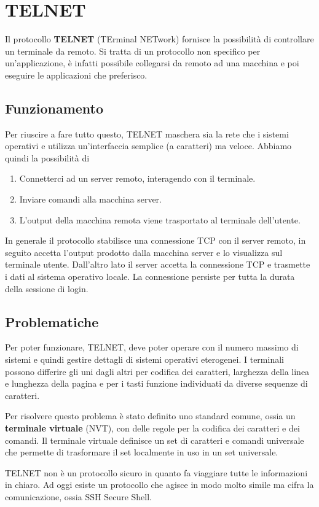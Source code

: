 \section{TELNET}
Il protocollo \textbf{TELNET} (TErminal NETwork) fornisce la possibilità di controllare un
terminale da remoto. Si tratta di un protocollo non specifico per un'applicazione, è infatti
possibile collegarsi da remoto ad una macchina e poi eseguire le applicazioni che preferisco.

\subsection{Funzionamento}
Per riuscire a fare tutto questo, TELNET maschera sia la rete che i sistemi operativi e utilizza
un'interfaccia semplice (a caratteri) ma veloce. Abbiamo quindi la possibilità di
\begin{enumerate}
	\item Connetterci ad un server remoto, interagendo con il terminale.
	\item Inviare comandi alla macchina server.
	\item L'output della macchina remota viene trasportato al terminale dell'utente.
\end{enumerate}
In generale il protocollo stabilisce una connessione TCP con il server remoto, in seguito accetta
l'output prodotto dalla macchina server e lo visualizza sul terminale utente. Dall'altro lato il 
server accetta la connessione TCP e trasmette i dati al sistema operativo locale. La connessione 
persiste per tutta la durata della sessione di login.

\subsection{Problematiche}
Per poter funzionare, TELNET, deve poter operare con il numero massimo di sistemi e quindi gestire
dettagli di sistemi operativi eterogenei. I terminali possono differire gli uni dagli altri per 
codifica dei caratteri, larghezza della linea e lunghezza della pagina e per i tasti funzione
individuati da diverse sequenze di caratteri.

Per risolvere questo problema è stato definito uno standard comune, ossia un
\textbf{terminale virtuale} (NVT), con delle regole per la codifica dei caratteri e dei comandi.
Il terminale virtuale definisce un set di caratteri e comandi universale che permette di
trasformare il set localmente in uso in un set universale.

TELNET non è un protocollo sicuro in quanto fa viaggiare tutte le informazioni in chiaro. Ad oggi
esiste un protocollo che agisce in modo molto simile ma cifra la comunicazione, ossia SSH Secure 
Shell.
